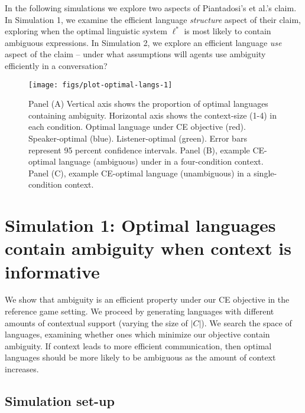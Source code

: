 \documentclass[10pt, letterpaper]{article}
\newenvironment{CodeChunk}{}{}
\begin{document}
In the following simulations we explore two aspects of Piantadosi's et
al.'s claim. In Simulation 1, we examine the efficient language
\emph{structure} aspect of their claim, exploring when the optimal
linguistic system \(\ell^*\) is most likely to contain ambiguous
expressions. In Simulation 2, we explore an efficient language
\emph{use} aspect of the claim -- under what assumptions will agents use
ambiguity efficiently in a conversation?\par

\begin{CodeChunk}
\begin{figure*}[h]

{\centering \texttt{[image: figs/plot-optimal-langs-1]} 

}

\caption[Panel (A) Vertical axis shows the proportion of optimal languages containing ambiguity]{Panel (A) Vertical axis shows the proportion of optimal languages containing ambiguity. Horizontal axis shows the context-size (1-4) in each condition. Optimal language under CE objective (red). Speaker-optimal (blue). Listener-optimal (green). Error bars represent 95 percent confidence intervals. Panel (B), example CE-optimal language (ambiguous) under in a four-condition context. Panel (C), example CE-optimal language (unambiguous) in a single-condition context.}\label{fig:plot-optimal-langs}
\end{figure*}
\end{CodeChunk}

\section{Simulation 1: Optimal languages contain ambiguity when context
is
informative}\label{simulation-1-optimal-languages-contain-ambiguity-when-context-is-informative}

We show that ambiguity is an efficient property under our CE objective
in the reference game setting. We proceed by generating languages with
different amounts of contextual support (varying the size of \(|C|\)).
We search the space of languages, examining whether ones which minimize
our objective contain ambiguity. If context leads to more efficient
communication, then optimal languages should be more likely to be
ambiguous as the amount of context increases.\par

\subsection{Simulation set-up}\label{simulation-set-up}
\end{document}
